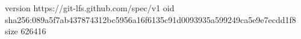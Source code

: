 version https://git-lfs.github.com/spec/v1
oid sha256:089a5f7ab437874312bc5956a16f6135c91d0093935a599249ca5e9e7ecdd1f8
size 626416
